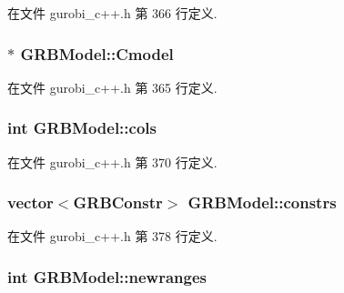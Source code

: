 在文件 gurobi\+\_\+c++.\+h 第 366 行定义.

\subsubsection[{\texorpdfstring{Cmodel}{Cmodel}}]{$\ast$ G\+R\+B\+Model\+::\+Cmodel\hspace{0.3cm}{\ttfamily [private]}}\hypertarget{classGRBModel_a8eedf4d4f2c9cd3159bd965d4595191f}{}\label{classGRBModel_a8eedf4d4f2c9cd3159bd965d4595191f}


在文件 gurobi\+\_\+c++.\+h 第 365 行定义.

\subsubsection[{\texorpdfstring{cols}{cols}}]{\setlength{\rightskip}{0pt plus 5cm}int G\+R\+B\+Model\+::cols\hspace{0.3cm}{\ttfamily [private]}}\hypertarget{classGRBModel_a7451154c68d35f13d44232c253d52fa8}{}\label{classGRBModel_a7451154c68d35f13d44232c253d52fa8}


在文件 gurobi\+\_\+c++.\+h 第 370 行定义.

\subsubsection[{\texorpdfstring{constrs}{constrs}}]{\setlength{\rightskip}{0pt plus 5cm}vector$<${\bf G\+R\+B\+Constr}$>$ G\+R\+B\+Model\+::constrs\hspace{0.3cm}{\ttfamily [private]}}\hypertarget{classGRBModel_a755e1d5f050c0244720ccca9610a1e02}{}\label{classGRBModel_a755e1d5f050c0244720ccca9610a1e02}


在文件 gurobi\+\_\+c++.\+h 第 378 行定义.

\subsubsection[{\texorpdfstring{newranges}{newranges}}]{\setlength{\rightskip}{0pt plus 5cm}int G\+R\+B\+Model\+::newranges\hspace{0.3cm}{\ttfamily [private]}}\hypertarget{classGRBModel_a358db0bf3a8f9bebcadc9403af27551f}{}\label{classGRBModel_a358db0bf3a8f9bebcadc9403af27551f}


